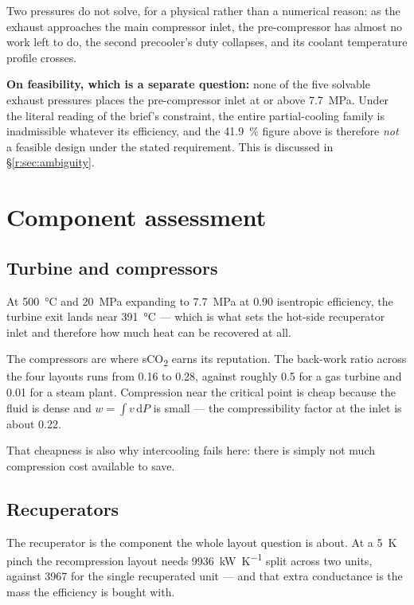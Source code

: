 Two pressures do not solve, for a physical rather than a numerical
reason: as the exhaust approaches the main compressor inlet, the
pre-compressor has almost no work left to do, the second precooler's
duty collapses, and its coolant temperature profile crosses.

\textbf{On feasibility, which is a separate question:} none of the five
solvable exhaust pressures places the pre-compressor inlet at or above
\SI{7.7}{\mega\pascal}. Under the literal reading of the brief's
constraint, the entire partial-cooling family is inadmissible whatever
its efficiency, and the \SI{41.9}{\percent} figure above is therefore
\emph{not} a feasible design under the stated requirement. This is
discussed in \S\ref{r:sec:ambiguity}.

\section{Component assessment}

\subsection{Turbine and compressors}

At \SI{500}{\celsius} and \SI{20}{\mega\pascal} expanding to
\SI{7.7}{\mega\pascal} at \num{0.90} isentropic efficiency, the turbine
exit lands near \SI{391}{\celsius} --- which is what sets the
hot-side recuperator inlet and therefore how much heat can be recovered
at all.

The compressors are where sCO\textsubscript{2} earns its reputation. The
back-work ratio across the four layouts runs from \num{0.16} to
\num{0.28}, against roughly \num{0.5} for a gas turbine and \num{0.01}
for a steam plant. Compression near the critical point is cheap because
the fluid is dense and $w = \int v\,\mathrm{d}P$ is small --- the
compressibility factor at the inlet is about \num{0.22}.

That cheapness is also why intercooling fails here: there is simply not
much compression cost available to save.

\subsection{Recuperators}

The recuperator is the component the whole layout question is about. At
a \SI{5}{\kelvin} pinch the recompression layout needs
\SI{9936}{\kilo\watt\per\kelvin} split across two units, against
\SI{3967}{} for the single recuperated unit --- and that extra
conductance is the mass the efficiency is bought with.

